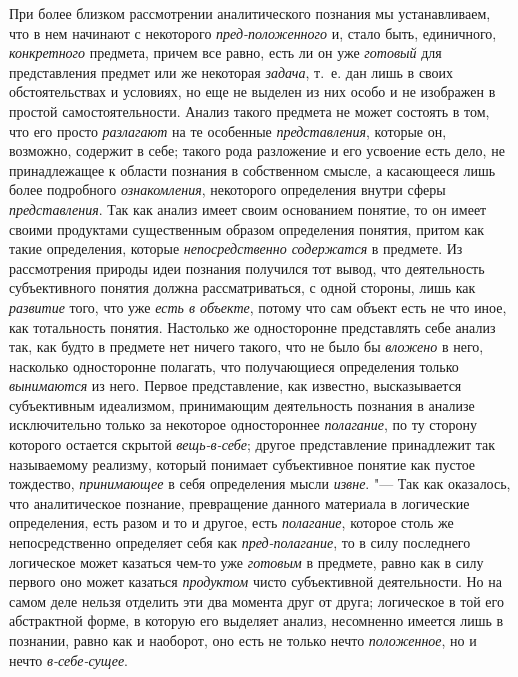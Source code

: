 При более близком рассмотрении аналитического познания мы
устанавливаем, что в нем начинают с некоторого
{\em пред-положенного}
и, стало быть, единичного,
{\em конкретного}
предмета, причем все равно, есть ли он уже
{\em готовый} для
представления предмет или же некоторая
{\em задача}, т.~е. дан
лишь в своих обстоятельствах и условиях, но еще не выделен из них особо и
не изображен в простой самостоятельности. Анализ такого предмета не может
состоять в том, что его просто
{\em разлагают} на те
особенные {\em представления},
которые он, возможно, содержит в себе; такого рода разложение
и его усвоение есть дело, не принадлежащее к области познания в собственном
смысле, а касающееся лишь более подробного
{\em ознакомления},
некоторого определения внутри сферы
{\em представления}. Так
как анализ имеет своим основанием понятие, то он имеет своими продуктами
существенным образом определения понятия, притом как такие определения,
которые {\em непосредственно
содержатся} в предмете. Из рассмотрения природы идеи
познания получился тот вывод, что деятельность субъективного понятия должна
рассматриваться, с одной стороны, лишь как
{\em развитие} того, что
уже {\em есть в объекте},
потому что сам объект есть не что иное, как тотальность
понятия. Настолько же односторонне представлять себе анализ так, как будто
в предмете нет ничего такого, что не было бы
{\em вложено} в него,
насколько односторонне полагать, что получающиеся определения
только {\em вынимаются}
из него. Первое представление, как известно, высказывается
субъективным идеализмом, принимающим деятельность познания в анализе
исключительно только за некоторое одностороннее
{\em полагание}, по ту
сторону которого остается скрытой
{\em вещь-в-себе}; другое
представление принадлежит так называемому реализму, который понимает
субъективное понятие как пустое тождество,
{\em принимающее} в себя
определения мысли {\em извне}. "---
Так как оказалось, что аналитическое познание, превращение
данного материала в логические определения, есть разом и то и другое, есть
{\em полагание}, которое
столь же непосредственно определяет себя как
{\em пред-полагание}, то
в силу последнего логическое может казаться чем-то уже
{\em готовым} в предмете,
равно как в силу первого оно может казаться
{\em продуктом} чисто
субъективной деятельности. Но на самом деле нельзя отделить эти два момента
друг от друга; логическое в той его абстрактной форме, в которую его
выделяет анализ, несомненно имеется лишь в познании, равно как и наоборот,
оно есть не только нечто
{\em положенное}, но и
нечто {\em в-себе-сущее}.

